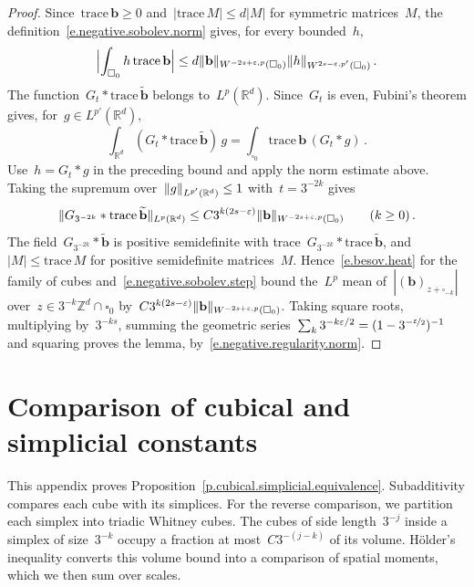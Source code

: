 \documentclass[11pt,letterpaper]{article}
\numberwithin{equation}{section}
\theoremstyle{definition}
\newcommand{\Rd}{\mathbb{R}^d}
\newcommand{\Zd}{\mathbb{Z}^d}
\newcommand{\eps}{\varepsilon}
\newcommand{\nf}{\nicefrac}
\newcommand{\cu}{\square}
\newcommand*{\tr}{\mathrm{trace\,}}
\DeclarePairedDelimiter{\norm}{\lVert}{\rVert}
\begin{document}
\begin{proof}
Since~$\tr\mathbf b\geq0$ and~$|\tr M|\leq d|M|$ for symmetric matrices~$M$, the definition~\eqref{e.negative.sobolev.norm} gives, for every bounded~$h$,
\begin{equation*}
	\Bigl|\int_{\cu_0}h\,\tr\mathbf b\Bigr|\leq d\norm{\mathbf b}_{W^{-2s+\eps,p}(\cu_0)}\norm{h}_{W^{2s-\eps,p'}(\cu_0)}\,.
\end{equation*}
The function~$G_t*\tr\widetilde{\mathbf b}$ belongs to~$L^p(\Rd)$. Since~$G_t$ is even, Fubini's theorem gives, for~$g\in L^{p'}(\Rd)$,
\begin{equation*}
	\int_{\Rd}(G_t*\tr\widetilde{\mathbf b})\,g=\int_{\cu_0}\tr\mathbf b\,(G_t*g)\,.
\end{equation*}
Use~$h=G_t*g$ in the preceding bound and apply the norm estimate above. Taking the supremum over~$\norm{g}_{L^{p'}(\Rd)}\leq1$ with~$t=3^{-2k}$ gives
\begin{equation}
	\norm{G_{3^{-2k}}*\tr\widetilde{\mathbf b}}_{L^p(\Rd)}\leq C3^{k(2s-\eps)}\norm{\mathbf b}_{W^{-2s+\eps,p}(\cu_0)}\qquad(k\geq0)\,.
	\label{e.negative.sobolev.step}
\end{equation}
The field~$G_{3^{-2k}}*\widetilde{\mathbf b}$ is positive semidefinite with trace~$G_{3^{-2k}}*\tr\widetilde{\mathbf b}$, and~$|M|\leq\tr M$ for positive semidefinite matrices~$M$. Hence~\eqref{e.besov.heat} for the family of cubes and~\eqref{e.negative.sobolev.step} bound the~$L^p$ mean of~$|(\mathbf b)_{z+\cu_{-k}}|$ over~$z\in3^{-k}\Zd\cap\cu_0$ by~$C3^{k(2s-\eps)}\norm{\mathbf b}_{W^{-2s+\eps,p}(\cu_0)}$. Taking square roots, multiplying by~$3^{-ks}$, summing the geometric series~$\sum_k3^{-k\eps/2}=(1-3^{-\nf\eps2})^{-1}$ and squaring proves the lemma, by~\eqref{e.negative.regularity.norm}.
\end{proof}


\section{Comparison of cubical and simplicial constants}
\label{a.cubical.simplicial}

This appendix proves Proposition~\ref{p.cubical.simplicial.equivalence}. Subadditivity compares each cube with its simplices. For the reverse comparison, we partition each simplex into triadic Whitney cubes. The cubes of side length~$3^{-j}$ inside a simplex of size~$3^{-k}$ occupy a fraction at most~$C3^{-(j-k)}$ of its volume. H\"older's inequality converts this volume bound into a comparison of spatial moments, which we then sum over scales.
\end{document}

